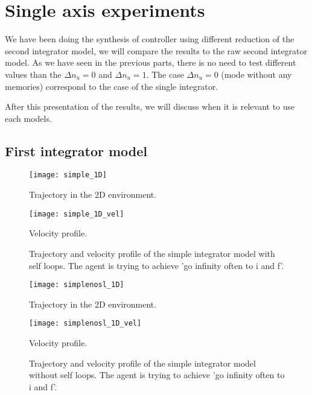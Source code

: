 \section{Single axis experiments}
We have been doing the synthesis of controller using different reduction of the second integrator model, we will compare the results to the raw second integrator model.
As we have seen in the previous parts, there is no need to test different values than the $\Delta n_u = 0$ and $\Delta n_u = 1$.
The case $\Delta n_u = 0$ (mode without any memories) correspond to the case of the single integrator.

After this presentation of the results, we will discuss when it is relevant to use each models.


\subsection{First integrator model} \label{sec:single_int}

\begin{figure}[!ht]
	\begin{minipage}[b]{0.5\textwidth}
  		\centering
  		\texttt{[image: simple\_1D]}
	  	\caption{Trajectory in the 2D environment.}
	  	\label{simple_1D}
  \end{minipage}
	\begin{minipage}[b]{0.5\textwidth}
  		\centering
  		\texttt{[image: simple\_1D\_vel]}
	  	\caption{Velocity profile.}
	  	\label{simple_1D_vel}
  \end{minipage}
  \caption{Trajectory and velocity profile of the simple integrator model with self loops. The agent is trying to achieve 'go infinity often to i and f'.}
\end{figure}

\begin{figure}[!ht]
	\begin{minipage}[b]{0.5\textwidth}
  		\centering
  		\texttt{[image: simplenosl\_1D]}
	  	\caption{Trajectory in the 2D environment.}
	  	\label{simplenosl_1D}
  \end{minipage}
	\begin{minipage}[b]{0.5\textwidth}
  		\centering
  		\texttt{[image: simplenosl\_1D\_vel]}
	  	\caption{Velocity profile.}
	  	\label{simplenosl_1D_vel}
  \end{minipage}
  \caption{Trajectory and velocity profile of the simple integrator model without self loops. The agent is trying to achieve 'go infinity often to i and f'.}
\end{figure}

